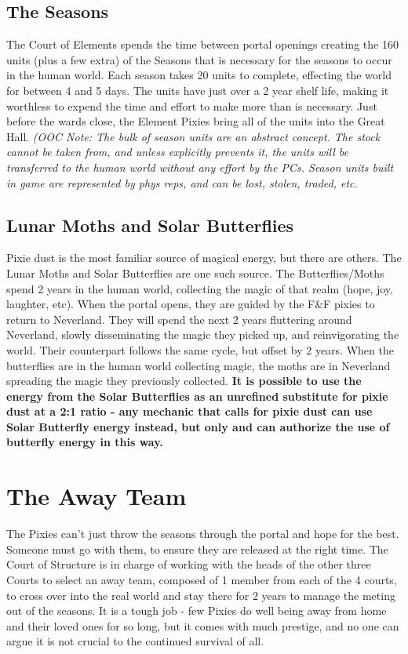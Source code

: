 \documentclass[blue]{PP}
\begin{document}
\subsection*{The Seasons}
The Court of Elements spends the time between portal openings creating the 160 units (plus a few extra) of the Seasons that is necessary for the seasons to occur in the human world. Each season takes 20 units to complete, effecting the world for between 4 and 5 days. The units have just over a 2 year shelf life, making it worthless to expend the time and effort to make more than is necessary. Just before the wards close, the Element Pixies bring all of the units into the Great Hall. \textit{(OOC Note: The bulk of season units are an abstract concept. The stock cannot be taken from, and unless \cEHead{} explicitly prevents it, the units will be transferred to the human world without any effort by the PCs. Season units built in game are represented by phys reps, and can be lost, stolen, traded, etc.}

\subsection*{Lunar Moths and Solar Butterflies}
Pixie dust is the most familiar source of magical energy, but there are others. The Lunar Moths and Solar Butterflies are one such source. The Butterflies/Moths spend 2 years in the human world, collecting the magic of that realm (hope, joy, laughter, etc). When the portal opens, they are guided by the F\&F pixies to return to Neverland. They will spend the next 2 years fluttering around Neverland, slowly disseminating the magic they picked up, and reinvigorating the world. Their counterpart follows the same cycle, but offset by 2 years. When the butterflies are in the human world collecting magic, the moths are in Neverland spreading the magic they previously collected. \textbf{It is possible to use the energy from the Solar Butterflies as an unrefined substitute for pixie dust at a 2:1 ratio - any mechanic that calls for pixie dust can use Solar Butterfly energy instead, but only \cFButterfly{} and \cFHead{} can authorize the use of butterfly energy in this way.}

\section*{The Away Team}
The Pixies can’t just throw the seasons through the portal and hope for the best. Someone must go with them, to ensure they are released at the right time. The Court of Structure is in charge of working with the heads of the other three Courts to select an away team, composed of 1  member from each of the 4 courts, to cross over into the real world and stay there for 2 years to manage the meting out of the seasons. It is a tough job - few Pixies do well being away from home and their loved ones for so long, but it comes with much prestige, and no one can argue it is not crucial to the continued survival of all.
\end{document}
